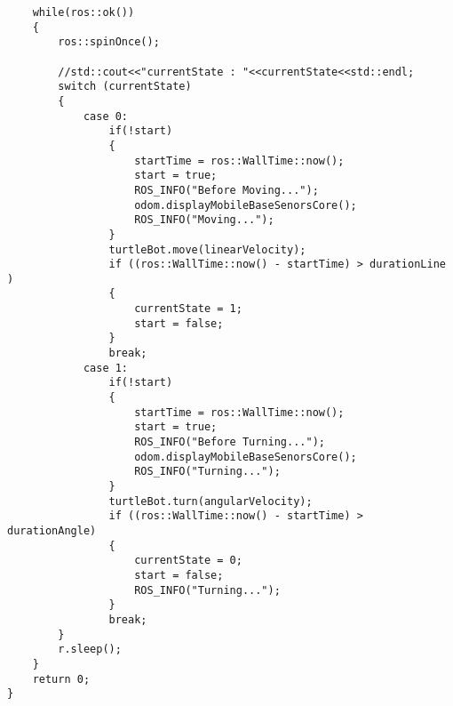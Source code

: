 \documentclass[10pt,a4paper]{article}
\newenvironment{DDbox}[1]{
\begin{lrbox}{\BBbox}\begin{minipage}{\linewidth}}
{\end{minipage}\end{lrbox}\noindent\colorbox{Zgris}{\usebox{\BBbox}} \\
[.5cm]}
\begin{document}
\begin{DDbox}{\linewidth}
\begin{lstlisting}
    while(ros::ok())
	{
        ros::spinOnce();

	    //std::cout<<"currentState : "<<currentState<<std::endl;
	    switch (currentState)
        {
            case 0:
                if(!start)
                {
                    startTime = ros::WallTime::now();
                    start = true;
					ROS_INFO("Before Moving...");
					odom.displayMobileBaseSenorsCore();
					ROS_INFO("Moving...");
                }
                turtleBot.move(linearVelocity);
                if ((ros::WallTime::now() - startTime) > durationLine )
                {
                    currentState = 1;
                    start = false;
                }
                break;
            case 1:
                if(!start)
                {
                    startTime = ros::WallTime::now();
                    start = true;
					ROS_INFO("Before Turning...");
					odom.displayMobileBaseSenorsCore();
					ROS_INFO("Turning...");
                }
                turtleBot.turn(angularVelocity);
                if ((ros::WallTime::now() - startTime) > durationAngle)
                {
                    currentState = 0;
                    start = false;
                    ROS_INFO("Turning...");
                }
                break;
	    }
	    r.sleep();
	}
    return 0;
}
\end{lstlisting}
\end{DDbox}
\end{document}
